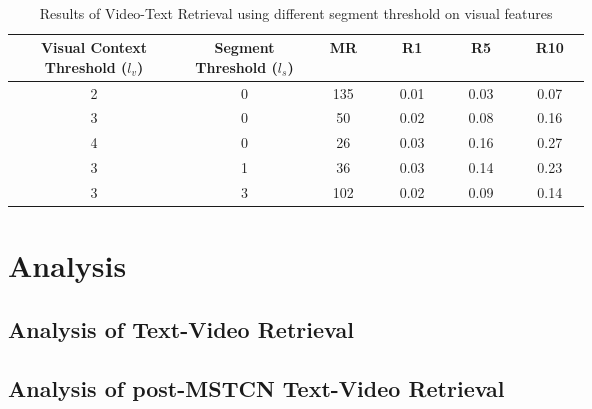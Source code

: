 \documentclass[11pt,a4paper]{article}
\begin{document}
\begin{table*}[h!]
\begin{minipage}[b]{1\textwidth}
\end{minipage}
~\\
\begin{minipage}[b]{1\textwidth}
\centering
\begin{tabular}
{c{0.2\linewidth}  c{0.15\linewidth} c{0.08\linewidth} c{0.08\linewidth}  c{0.08\linewidth}  c{0.08\linewidth}}
\toprule
Visual Context Threshold ($l_v$) & Segment Threshold ($l_s$) & MR & R1 & R5 & R10 \\
\midrule
2 & 0 & 135 & 0.01 & 0.03 & 0.07 \\
3 & 0 & 50 & 0.02 & 0.08 & 0.16 \\
4 & 0 & 26 & 0.03 & 0.16 & 0.27 \\
3 & 1 & 36 & 0.03 & 0.14 & 0.23 \\
3 & 3 & 102 & 0.02 & 0.09 & 0.14 \\
\bottomrule
\end{tabular}
\caption{Results of Video-Text Retrieval using different segment threshold on visual features}
\label{table:howto100m_visual_seg_threshold}
\end{minipage}
\end{table*}

\section{Analysis}


\subsection{Analysis of Text-Video Retrieval} 


\subsection{Analysis of post-MSTCN Text-Video Retrieval} 




% 
\end{document}
